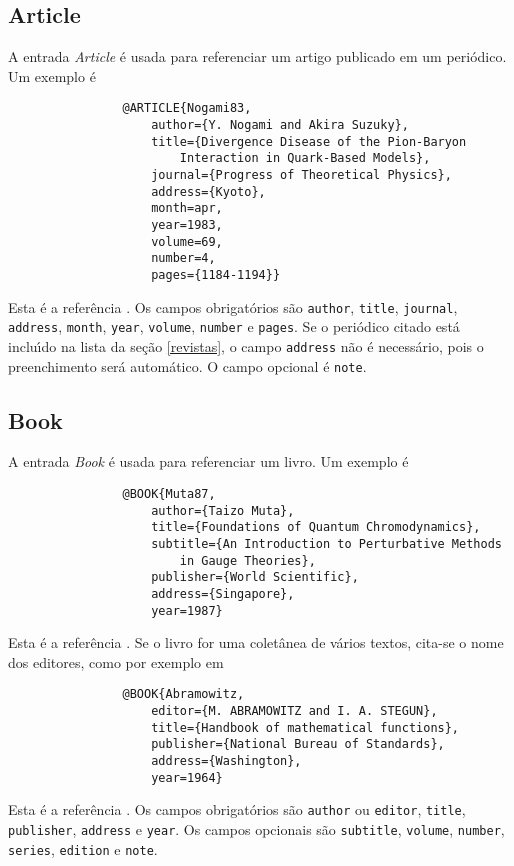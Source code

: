 \documentclass[a4paper,12pt]{article}
\newcommand{\ii}{\'{\i}}
\newcommand{\ca}{\c{c}\~ao}
\newcommand{\enf}{\em}
\begin{document}
			
			\subsection*{Article}
			
			A entrada {\enf Article} \'e usada para referenciar um artigo publicado
			em um peri\'odico.
			Um exemplo \'e
			\begin{verbatim}
				@ARTICLE{Nogami83,
					author={Y. Nogami and Akira Suzuky}, 
					title={Divergence Disease of the Pion-Baryon
						Interaction in Quark-Based Models},
					journal={Progress of Theoretical Physics},
					address={Kyoto},
					month=apr,
					year=1983,
					volume=69,
					number=4,
					pages={1184-1194}}
			\end{verbatim}
			Esta \'e a refer\^encia \cite{Nogami83}.
			Os campos obrigat\'orios s\~ao \verb+author+, \verb+title+, \verb+journal+, 
			\verb+address+, \verb+month+, \verb+year+, \verb+volume+, \verb+number+ e
			\verb+pages+. Se o peri\'odico citado est\'a inclu{\ii}do na lista
			da se{\ca} \ref{revistas}, o campo \verb+address+ n\~ao \'e
			necess\'ario, pois o preenchimento ser\'a autom\'atico.
			O campo opcional \'e \verb+note+.
			
			
			\subsection*{Book}
			
			A entrada {\enf Book} \'e usada para referenciar um livro.
			Um exemplo \'e
			\begin{verbatim}
				@BOOK{Muta87,
					author={Taizo Muta},
					title={Foundations of Quantum Chromodynamics},
					subtitle={An Introduction to Perturbative Methods
						in Gauge Theories},
					publisher={World Scientific},
					address={Singapore},
					year=1987}
			\end{verbatim}
			Esta \'e a refer\^encia \cite{Muta87}. Se o livro for
			uma colet\^anea de v\'arios textos, cita-se o nome dos editores, 
			como por exemplo em
			\begin{verbatim}
				@BOOK{Abramowitz,
					editor={M. ABRAMOWITZ and I. A. STEGUN},
					title={Handbook of mathematical functions},
					publisher={National Bureau of Standards},
					address={Washington},
					year=1964}
			\end{verbatim}
			Esta \'e a refer\^encia \cite{Abramowitz}.
			Os campos obrigat\'orios s\~ao \verb+author+ ou \verb+editor+,
			\verb+title+, \verb+publisher+, \verb+address+ e \verb+year+.
			Os campos opcionais s\~ao \verb+subtitle+, \verb+volume+, \verb+number+,
			\verb+series+, \verb+edition+ e \verb+note+.
			
\end{document}
